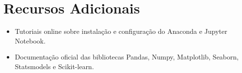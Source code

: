 \section{Recursos Adicionais}
\begin{itemize}
    \item Tutoriais online sobre instalação e configuração do Anaconda e Jupyter Notebook.
    \item Documentação oficial das bibliotecas Pandas, Numpy, Matplotlib, Seaborn, Statsmodels e Scikit-learn.
\end{itemize}
